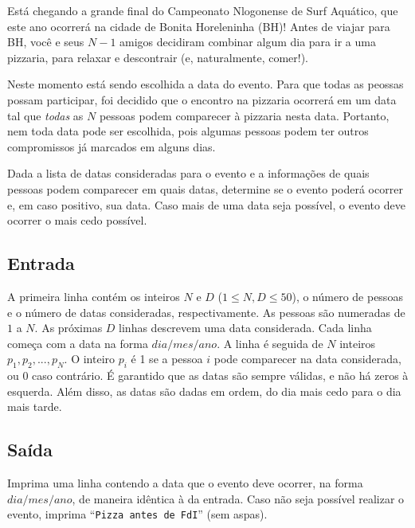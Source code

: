 Está chegando a grande final do Campeonato Nlogonense de Surf Aquático, que este
ano ocorrerá na cidade de Bonita Horeleninha (BH)!
Antes de viajar para BH, você e seus $N-1$ amigos decidiram combinar algum dia
para ir a uma pizzaria, para relaxar e descontrair (e, naturalmente, comer!).

Neste momento está sendo escolhida a data do evento.
Para que todas as peossas possam participar, foi decidido
que o encontro na pizzaria ocorrerá em um data tal que \textit{todas} as $N$
pessoas podem comparecer à pizzaria nesta data. Portanto, nem toda data pode ser
escolhida, pois algumas pessoas podem ter outros compromissos já marcados em
alguns dias.

Dada a lista de datas consideradas para o evento e a informações de quais
pessoas podem comparecer em quais datas, determine se o evento poderá
ocorrer e, em caso positivo, sua data.
Caso mais de uma data seja possível, o evento deve ocorrer o mais cedo
possível.

\subsection*{Entrada}

A primeira linha contém os inteiros $N$ e $D$ ($1 \leq N, D \leq 50$), o número de pessoas e o número de datas consideradas,
respectivamente. As pessoas são numeradas de $1$ a $N$.
As próximas $D$ linhas descrevem uma data considerada. Cada linha começa com a
data na forma $dia/mes/ano$. A linha é seguida de
$N$ inteiros $p_1, p_2,...,p_N$. O
inteiro $p_i$ é 1 se a pessoa $i$ pode comparecer na data considerada, ou $0$
caso contrário.
É garantido que as datas são sempre válidas, e não há zeros à esquerda. Além
disso, as datas são dadas em ordem, do dia mais cedo para o dia mais tarde.

\subsection*{Saída}

Imprima uma linha contendo a data que o evento deve ocorrer, na forma
$dia/mes/ano$, de maneira idêntica à da entrada. Caso não seja
possível realizar o evento, imprima ``\verb|Pizza antes de FdI|'' (sem aspas).

